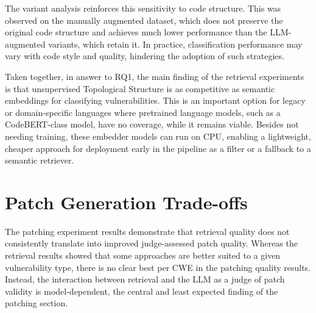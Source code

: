 The variant analysis reinforces this sensitivity to code structure. This was observed on the manually augmented dataset, which does not preserve the original code structure and achieves much lower performance than the LLM-augmented variants, which retain it. In practice, classification performance may vary with code style and quality, hindering the adoption of such strategies.

Taken together, in answer to RQ1, the main finding of the retrieval experiments is that unsupervised Topological Structure is as competitive as semantic embeddings for classifying vulnerabilities. This is an important option for legacy or domain-specific languages where pretrained language models, such as a CodeBERT-class model, have no coverage, while it remains viable.
Besides not needing training, these embedder models can run on CPU, enabling a lightweight, cheaper approach for deployment early in the pipeline as a filter or a fallback to a semantic retriever.



 
\section{Patch Generation Trade-offs}\label{sec:conclusion_patch_generation}

The patching experiment results demonstrate that retrieval quality does not consistently translate into improved judge-assessed patch quality.
Whereas the retrieval results showed that some approaches are better suited to a given vulnerability type, there is no clear best per CWE in the patching quality results. 
Instead, the interaction between retrieval and the LLM as a judge of patch validity is model-dependent, the central and least expected finding of the patching section.

